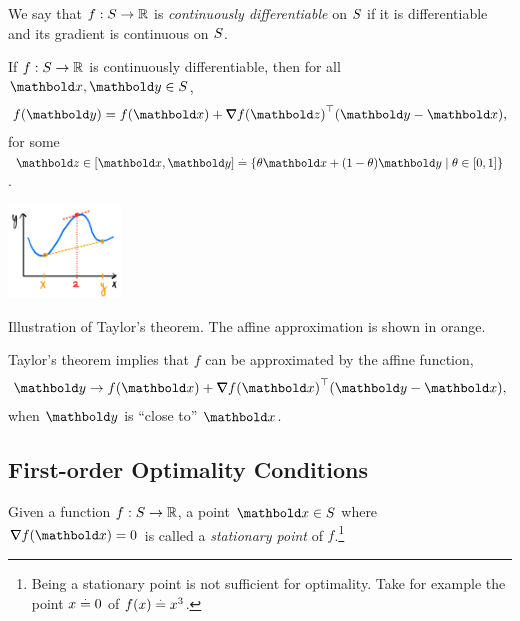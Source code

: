 \begin{defn} We say that $f : S \to \mathbb{R}$ is \emph{continuously differentiable} on $S$ if it is differentiable and its gradient is continuous on $S$.
\end{defn}

\begin{thm} If $f: S \to \mathbb{R}$ is continuously differentiable, then for all $\vx, \vy \in \sS$, \begin{align}
    f(\vy) = f(\vx) + \trans{\grad f(\vz)}(\vy - \vx),
\end{align} for some $\vz \in [\vx, \vy] \defeq \{\theta\vx + (1-\theta)\vy \mid \theta \in [0,1]\}$.
\end{thm}\begin{marginfigure}
\centering\includegraphics[width=3cm]{notes/figures/taylors_theorem.png}
\caption{Illustration of Taylor's theorem. The affine approximation is shown in orange.}
\end{marginfigure}\noindent Taylor's theorem implies that $f$ can be approximated by the affine function, \begin{align*}
    \vy \to f(\vx) + \trans{\grad f(\vx)}(\vy - \vx),
\end{align*} when $\vy$ is ``close to'' $\vx$.

\subsection{First-order Optimality Conditions}

\begin{defn} Given a function $f: S \to \mathbb{R}$, a point $\vx \in \sS$ where $\grad f(\vx) = 0$ is called a \emph{stationary point} of $f$.\footnote{Being a stationary point is not sufficient for optimality. Take for example the point $x \overset{.}{=} 0$ of $f(x) \overset{.}{=} x^3$.}
\end{defn}

